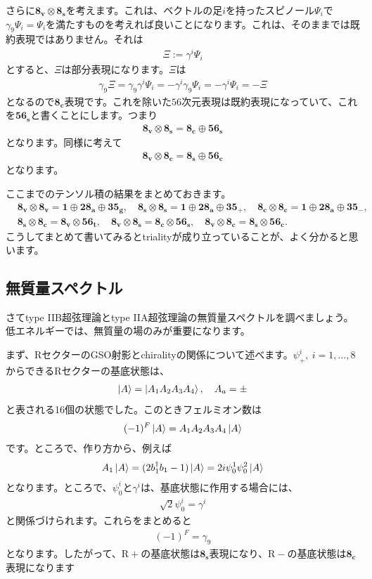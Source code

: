 \documentclass[report,paper=a4, fontsize=12pt, line_length=16cm, number_of_lines=33,dvipdfmx]{jlreq}
\numberwithin{equation}{chapter}
\numberwithin{equation}{section}
\newcommand{\Rp}{\mathrm{R}+}
\newcommand{\Rm}{\mathrm{R}-}
\newcommand{\triv}{\mathbf{1}}
\newcommand{\etv}{\mathbf{8_v}}
\newcommand{\ets}{\mathbf{8_s}}
\newcommand{\etc}{\mathbf{8_c}}
\newcommand{\tweta}{\mathbf{28_{a}}}
\newcommand{\thfvg}{\mathbf{35_{g}}}
\newcommand{\thfvp}{\mathbf{35}_{+}}
\newcommand{\thfvm}{\mathbf{35}_{-}}
\newcommand{\fsxt}{\mathbf{56_t}}
\newcommand{\fsxs}{\mathbf{56_s}}
\newcommand{\fsxc}{\mathbf{56_c}}
\begin{document}
さらに$\etv\otimes \ets$を考えます。これは、ベクトルの足$i$を持ったスピノール$\Psi_i$で$\gamma_9 \Psi_i=\Psi_i$を満たすものを考えれば良いことになります。これは、そのままでは既約表現ではありません。それは
\begin{align}
  \Xi:=\gamma^{i}\Psi_i
\end{align}
とすると、$\Xi$は部分表現になります。$\Xi$は
\begin{align}
  \gamma_9\Xi
  =\gamma_9\gamma^{i}\Psi_i
  =-\gamma^{i}\gamma_9\Psi_i
  =-\gamma^{i}\Psi_i
  =-\Xi
\end{align}
となるので$\etc$表現です。これを除いた$56$次元表現は既約表現になっていて、これを$\fsxs$と書くことにします。つまり
\begin{align}
  \etv\otimes \ets=\etc\oplus\fsxs
\end{align}
となります。同様に考えて
\begin{align}
  \etv\otimes \etc=\ets\oplus\fsxc
\end{align}
となります。

ここまでのテンソル積の結果をまとめておきます。
\begin{align}
  &\etv\otimes\etv=\triv \oplus \tweta\oplus \thfvg,\quad
  \ets\otimes\ets=\triv \oplus \tweta\oplus \thfvp,\quad
  \etc\otimes\etc=\triv \oplus \tweta\oplus \thfvm,\nonumber\\
  &\ets\otimes \etc=\etv\otimes\fsxt,\quad
  \etv\otimes \ets=\etc\otimes\fsxs,\quad
  \etv\otimes \etc=\ets\otimes\fsxc.
\end{align}
こうしてまとめて書いてみるとtrialityが成り立っていることが、よく分かると思います。

\subsection{無質量スペクトル}
さてtype IIB超弦理論とtype IIA超弦理論の無質量スペクトルを調べましょう。低エネルギーでは、無質量の場のみが重要になります。

まず、RセクターのGSO射影とchiralityの関係について述べます。$\psi^{i}_{+},\ i=1,\dots,8$からできるRセクターの基底状態は、
\begin{align}
  \ket{A}=\ket{A_1A_2A_3A_4},\quad
  A_a=\pm
\end{align}
と表される16個の状態でした。このときフェルミオン数は
\begin{align}
  (-1)^{F}\ket{A}=A_1A_2A_3A_4\ket{A}
\end{align}
です。ところで、作り方から、例えば
\begin{align}
  A_1\ket{A}=(2b_1^\dag b_1-1)\ket{A}=2i\psi^{1}_{0}\psi^{2}_{0}\ket{A}
\end{align}
となります。ところで、$\psi_0^{i}$と$\gamma^{i}$は、基底状態に作用する場合には、
\begin{align}
  \sqrt{2}\psi_{0}^{i}=\gamma^{i}
\end{align}
と関係づけられます。これらをまとめると
\begin{align}
  (-1)^{F}=\gamma_9
\end{align}
となります。したがって、$\Rp$の基底状態は$\ets$表現になり、$\Rm$の基底状態は$\etc$表現になります
\end{document}

